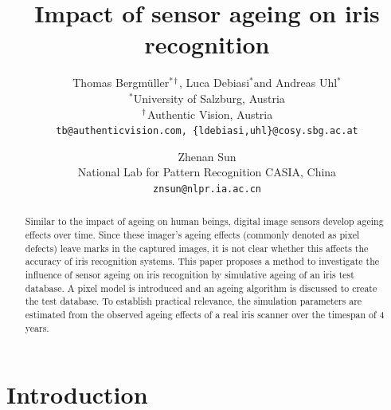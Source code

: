 \documentclass[10pt,twocolumn,letterpaper]{article}
\newcommand{\superscript}[1]{\ensuremath{^{\textrm{#1}}}}
\def\wu{\superscript{*}}
\def\wg{\superscript{\dag}}
\begin{document}
\title{Impact of sensor ageing on iris recognition}

\author{Thomas Bergm{\"u}ller\wu\wg, Luca Debiasi\wu and Andreas Uhl\wu\\
\wu University of Salzburg, Austria \\
\wg Authentic Vision, Austria\\
{\tt\small tb@authenticvision.com, \tt\small \{ldebiasi,uhl\}@cosy.sbg.ac.at}
\and
Zhenan Sun\\
National Lab for Pattern Recognition CASIA, China\\
{\tt\small znsun@nlpr.ia.ac.cn}
}


\maketitle
\thispagestyle{empty}

\begin{abstract}
   Similar to the impact of ageing on human beings, digital image sensors develop ageing effects over time. Since these imager's ageing effects (commonly denoted as pixel defects) leave marks in the captured images, it is not clear whether this affects the accuracy of iris recognition systems. This paper proposes a method to investigate the influence of sensor ageing on iris recognition by simulative ageing of an iris test database. A pixel model is introduced and an ageing algorithm is discussed to create the test database. To establish practical relevance, the simulation parameters are estimated from the observed ageing effects of a real iris scanner over the timespan of 4 years.
\end{abstract}




\section{Introduction}
\end{document}

